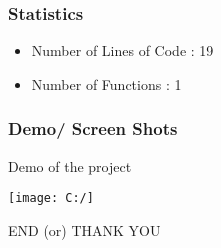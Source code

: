 \documentclass[14pt]{beamer}
\begin{document}
    \begin{frame}
	\frametitle{Statistics}
        \begin{itemize}
	     \item Number of Lines of Code : 19
	     \item Number of Functions : 1
        \end{itemize}
    \end{frame}
    \begin{frame}
	\frametitle{Demo/ Screen Shots}
	\begin{itemize}
	  {  \item Demo of the project}
	   { \texttt{[image: C:/]}}
	\end{itemize}
    \end{frame}
    \begin{frame}
	\begin{center}
	     END (or) THANK YOU
	\end{center}
    \end{frame}
\end{document}
